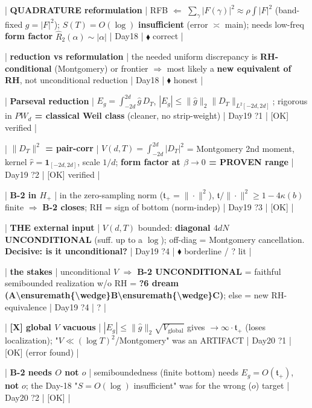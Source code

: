 \documentclass[10pt]{article}
\begin{document}
| \textbf{QUADRATURE reformulation} | RFB $\Leftarrow$ $\sum_\gamma|F(\gamma)|^2\approx\rho\int|F|^2$ (band-fixed $g=|F|^2$); $S(T)=O(\log)$ \textbf{insufficient} (error $\asymp$ main); needs low-freq \textbf{form factor} $\widehat R_2(\alpha)\sim|\alpha|$ | Day18 | $\blacklozenge$ correct |\par
| \textbf{reduction vs reformulation} | the needed uniform discrepancy is \textbf{RH-conditional} (Montgomery) or frontier \ensuremath{\Rightarrow} most likely a \textbf{new equivalent of RH}, not unconditional reduction | Day18 | $\blacklozenge$ honest |\par
| \textbf{Parseval reduction} | $E_g=\int_{-2d}^{2d}\widehat g\,D_T$, $|E_g|\le\|\widehat g\|_2\|D_T\|_{L^2[-2d,2d]}$; rigorous in \textbf{$PW_d$ = classical Weil class} (cleaner, no strip-weight) | Day19 ?1 | [OK] verified |\par
| \textbf{$\|D_T\|^2$ = pair-corr} | $V(d,T)=\int_{-2d}^{2d}|D_T|^2$ = Montgomery 2nd moment, kernel $\widehat r=\mathbf 1_{[-2d,2d]}$, scale $1/d$; \textbf{form factor at $\beta\to0$ = PROVEN range} | Day19 ?2 | [OK] verified |\par
| \textbf{B-2 in $H_+$} | in the zero-sampling norm ($\mathfrak t_+=\|\cdot\|^2$), $\mathfrak t/\|\cdot\|^2\ge1-4\kappa(b)$ finite \ensuremath{\Rightarrow} \textbf{B-2 closes}; RH = sign of bottom (norm-indep) | Day19 ?3 | [OK] |\par
| \textbf{THE external input} | $V(d,T)$ bounded: \textbf{diagonal $4dN$ UNCONDITIONAL} (suff. up to a $\log$); off-diag = Montgomery cancellation. \textbf{Decisive: is it unconditional?} | Day19 ?4 | $\blacklozenge$ borderline / ? lit |\par
| \textbf{the stakes} | unconditional $V$ \ensuremath{\Rightarrow} \textbf{B-2 UNCONDITIONAL} = faithful semibounded realization w/o RH = \textbf{?6 dream (A\textbackslash{}ensuremath\{\textbackslash{}wedge\}B\textbackslash{}ensuremath\{\textbackslash{}wedge\}C)}; else = new RH-equivalence | Day19 ?4 | ? |\par
| \textbf{[X] global $V$ vacuous} | $|E_g|\le\|\widehat g\|_2\sqrt{V_{\mathrm{global}}}$ gives $\to\infty\cdot\mathfrak t_+$ (loses localization); "$V\ll(\log T)^2$/Montgomery" was an ARTIFACT | Day20 ?1 | [OK] (error found) |\par
| \textbf{B-2 needs $O$ not $o$} | semiboundedness (finite bottom) needs $E_g=O(\mathfrak t_+)$, \textbf{not} $o$; the Day-18 "$S=O(\log)$ insufficient" was for the wrong ($o$) target | Day20 ?2 | [OK] |\par
\end{document}
